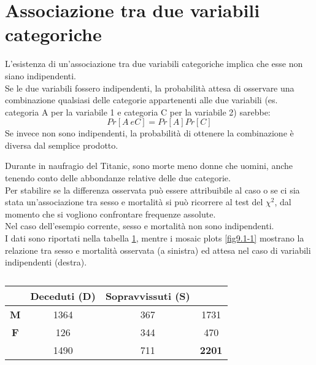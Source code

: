 \documentclass[drafts, 10pt]{book}
\newcounter{example}[section]
\begin{document}
\section{Associazione tra due variabili categoriche}
L'esistenza di un'associazione tra due variabili categoriche implica che esse non siano indipendenti.
\\
Se le due variabili fossero indipendenti, la probabilità attesa di osservare una combinazione qualsiasi delle categorie appartenenti alle due variabili (es. categoria A per la variabile 1 e categoria C per la variabile 2) sarebbe:
\begin{equation}
Pr[A\ e C] = Pr[A] Pr[C]
\end{equation}
Se invece non sono indipendenti, la probabilità di ottenere la combinazione è diversa dal semplice prodotto.
\begin{example}
    Durante in naufragio del Titanic, sono morte meno donne che uomini, anche tenendo conto delle abbondanze relative delle due categorie.
    \\
    Per stabilire se la differenza osservata può essere attribuibile al caso o se ci sia stata un'associazione tra sesso e mortalità si può ricorrere al test del $\chi^2$, dal momento che si vogliono confrontare frequenze assolute.
    \\
    Nel caso dell'esempio corrente, sesso e mortalità non sono indipendenti.
    \\
    I dati sono riportati nella tabella \ref{tabtitanic}, mentre i mosaic plots \ref{fig9.1-1} mostrano la relazione tra sesso e mortalità osservata (a sinistra) ed attesa nel caso di variabili indipendenti (destra).
\begin{table}[H]
        \centering
        \renewcommand\arraystretch{1.2}
        \begin{tabular}{c|c|c|c}
        \hline
         & \textbf{Deceduti (D)} & \textbf{Sopravvissuti (S)} & \\
        \hline
        \textbf{M} & 1364 & 367 & 1731 \\
        \hline
        \textbf{F} & 126 & 344 & 470\\
        \hline
         & 1490 & 711 & \textbf{2201}\\
        \hline
        \end{tabular}
        \caption{}
        \label{tabtitanic}
\end{table}\noindent
\end{example}
\end{document}
